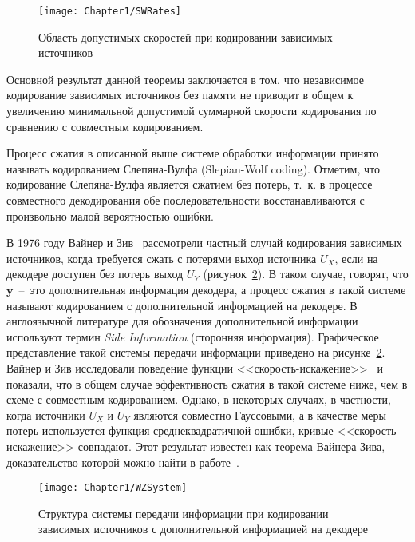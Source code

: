 \begin{figure}[htbp]
\begin{center}
\texttt{[image: Chapter1/SWRates]}
\caption{Область допустимых скоростей при кодировании зависимых источников}
\label{fig:SWRates}
\end{center}
\end{figure}

Основной результат данной теоремы заключается в том, что независимое кодирование зависимых источников без памяти не приводит в общем к увеличению минимальной допустимой суммарной скорости кодирования по сравнению с совместным кодированием.

Процесс сжатия в описанной выше системе обработки информации принято называть кодированием Слепяна-Вулфа (Slepian-Wolf coding). Отметим, что кодирование Слепяна-Вулфа является сжатием без потерь, т.~к. в процессе совместного декодирования обе последовательности восстанавливаются с произвольно малой вероятностью ошибки.

В 1976 году Вайнер и Зив~\cite{Wyner1976} рассмотрели частный случай кодирования зависимых источников, когда требуется сжать с потерями выход источника $U_X$, если на декодере доступен без потерь выход $U_Y$ (рисунок~\ref{fig:WZSystem}). В таком случае, говорят, что $\mathbf{y}$~--~это дополнительная информация декодера, а процесс сжатия в такой системе называют кодированием с дополнительной информацией на декодере. В англоязычной литературе для обозначения дополнительной информации используют термин \emph{Side Information} (сторонняя информация). Графическое представление такой системы передачи информации приведено на рисунке~\ref{fig:WZSystem}. Вайнер и Зив исследовали поведение функции <<скорость-искажение>>~\cite{kudryashow2009} и показали, что в общем случае эффективность сжатия в такой системе ниже, чем в схеме с совместным кодированием. Однако, в некоторых случаях, в частности, когда источники $U_X$ и $U_Y$ являются совместно Гауссовыми, а в качестве меры потерь используется функция среднеквадратичной ошибки, кривые <<скорость-искажение>> совпадают. Этот результат известен как теорема Вайнера-Зива, доказательство которой можно найти в работе~\cite{Wyner1976}.

\begin{figure}[htbp]
\begin{center}
\texttt{[image: Chapter1/WZSystem]}
\caption{Структура системы передачи информации при кодировании зависимых источников с дополнительной информацией на декодере}
\label{fig:WZSystem}
\end{center}
\end{figure}

